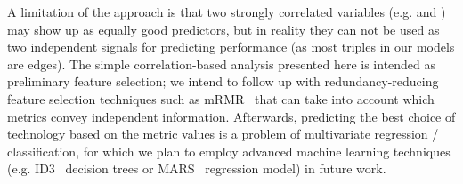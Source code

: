 A limitation of the approach is that two strongly correlated variables (e.g.
 and ) may show up as equally good
predictors, but in reality they can not be used as two independent signals for
predicting performance (as most triples in our models are edges). The simple
correlation-based analysis presented here is intended as preliminary feature
selection; we intend to follow up with redundancy-reducing feature selection
techniques such as mRMR~\cite{mRMR-1453511} that can take into account which
metrics convey independent information. Afterwards, predicting the best choice
of technology based on the metric values is a problem of multivariate regression
/ classification, for which we plan to employ advanced machine learning
techniques (e.g. ID3~\cite{ID3-quinlan-1986} decision trees or
MARS~\cite{MARS-MR1091842} regression model) in future work.

